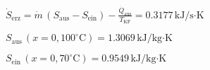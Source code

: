 \( \dot{S}_{\text{erz}} = \dot{m} \, (S_{\text{aus}} - S_{\text{ein}}) - \frac{\dot{Q}_{\text{aus}}}{T_{\text{KF}}} = 0.3177 \, \text{kJ/s·K} \)  

\( S_{\text{aus}} \, (x = 0, 100^\circ \text{C}) = 1.3069 \, \text{kJ/kg·K} \)  

\( S_{\text{ein}} \, (x = 0, 70^\circ \text{C}) = 0.9549 \, \text{kJ/kg·K} \)